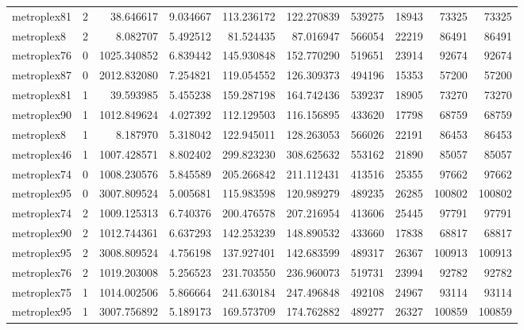\begin{longtable}{|l|r|r|r|r|r|r|r|r|r|}
metroplex81 & 2 & 38.646617 & 9.034667 & 113.236172 & 122.270839 & 539275 & 18943 & 73325 & 73325 \\
metroplex8 & 2 & 8.082707 & 5.492512 & 81.524435 & 87.016947 & 566054 & 22219 & 86491 & 86491 \\
metroplex76 & 0 & 1025.340852 & 6.839442 & 145.930848 & 152.770290 & 519651 & 23914 & 92674 & 92674 \\
metroplex87 & 0 & 2012.832080 & 7.254821 & 119.054552 & 126.309373 & 494196 & 15353 & 57200 & 57200 \\
metroplex81 & 1 & 39.593985 & 5.455238 & 159.287198 & 164.742436 & 539237 & 18905 & 73270 & 73270 \\
metroplex90 & 1 & 1012.849624 & 4.027392 & 112.129503 & 116.156895 & 433620 & 17798 & 68759 & 68759 \\
metroplex8 & 1 & 8.187970 & 5.318042 & 122.945011 & 128.263053 & 566026 & 22191 & 86453 & 86453 \\
metroplex46 & 1 & 1007.428571 & 8.802402 & 299.823230 & 308.625632 & 553162 & 21890 & 85057 & 85057 \\
metroplex74 & 0 & 1008.230576 & 5.845589 & 205.266842 & 211.112431 & 413516 & 25355 & 97662 & 97662 \\
metroplex95 & 0 & 3007.809524 & 5.005681 & 115.983598 & 120.989279 & 489235 & 26285 & 100802 & 100802 \\
metroplex74 & 2 & 1009.125313 & 6.740376 & 200.476578 & 207.216954 & 413606 & 25445 & 97791 & 97791 \\
metroplex90 & 2 & 1012.744361 & 6.637293 & 142.253239 & 148.890532 & 433660 & 17838 & 68817 & 68817 \\
metroplex95 & 2 & 3008.809524 & 4.756198 & 137.927401 & 142.683599 & 489317 & 26367 & 100913 & 100913 \\
metroplex76 & 2 & 1019.203008 & 5.256523 & 231.703550 & 236.960073 & 519731 & 23994 & 92782 & 92782 \\
metroplex75 & 1 & 1014.002506 & 5.866664 & 241.630184 & 247.496848 & 492108 & 24967 & 93114 & 93114 \\
metroplex95 & 1 & 3007.756892 & 5.189173 & 169.573709 & 174.762882 & 489277 & 26327 & 100859 & 100859 \\
\end{longtable}
